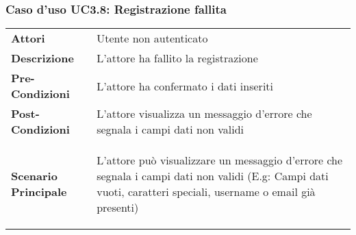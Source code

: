 \subsubsection{Caso d'uso UC3.8: Registrazione fallita}
\label{UC3_8}

\begin{minipage}{\linewidth}
\begin{longtable}{ l | p{11cm}}
	\hline
	\rowcolor{Gray}
	 \multicolumn{2}{c}{UC3.8 - Registrazione fallita} \\
	 \hline
	\textbf{Attori} & Utente non autenticato \\
	\textbf{Descrizione} & L'attore ha fallito la registrazione  \\
	\textbf{Pre-Condizioni} & L'attore ha confermato i dati inseriti \\
	\textbf{Post-Condizioni} & L'attore visualizza un messaggio d'errore che segnala i campi dati non validi \\
	\textbf{Scenario Principale} & \begin{enumerate*}[label=(\arabic*.),itemjoin={\newline}]
		\item L'attore può visualizzare un messaggio d'errore che segnala i campi dati non validi (E.g: Campi dati vuoti, caratteri speciali, username o email già presenti) 
	\end{enumerate*}\\
\end{longtable}
\end{minipage}